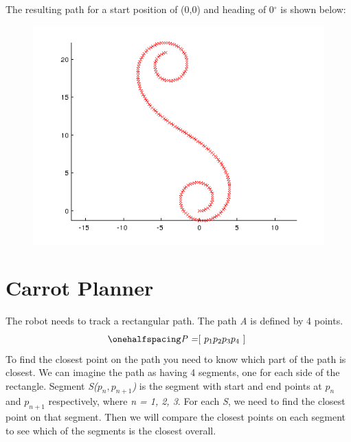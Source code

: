 \documentclass[12pt]{article}
\begin{document}
The resulting path for a start position of (0,0) and heading of 0$^\circ$ is shown below:
\begin{figure}[ht]
\hspace{0.5cm}
\centering
\includegraphics[scale=0.5]{Pictures/bikemodel.png}
\end{figure}

\newpage
\singlespacing
\section{Carrot Planner}
\setlength{\parindent}{1cm}

The robot needs to track a rectangular path. The path \textit{A} is defined by 4 points.
\begin{equation}
\onehalfspacing
\centering
\emph{P =\textnormal{\lbrack} $p_1 p_2 p_3 p_4$ \textnormal{\rbrack} }
\end{equation}
To find the closest point on the path you need to know which part of the path is closest. We can imagine the path as having 4 segments, one for each side of the rectangle. Segment \textit{S($p_n, p_{n+1}$)} is the segment with start and end points at \textit{$p_n$} and \textit{$p_{n+1}$} respectively, where \textit{n = 1, 2, 3}. For each \textit{S}, we need to find the closest point on that segment. Then we will compare the closest points on each segment to see which of the segments is the closest overall. 
\end{document}
